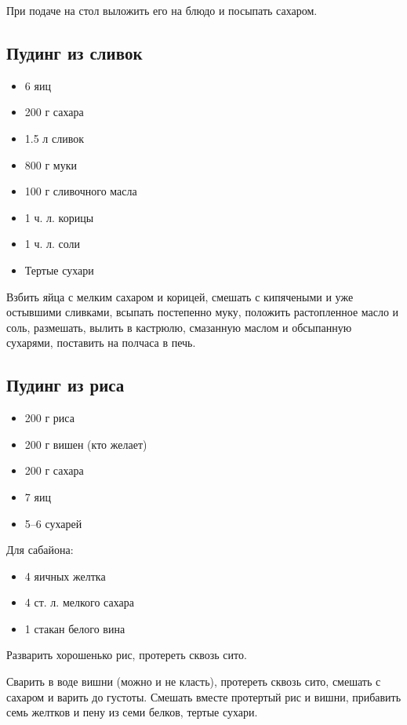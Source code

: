 При подаче на стол выложить его на блюдо и посыпать сахаром.

\subsection{Пудинг из сливок}

\begin{itemize}
	\item 6 яиц 
    \item 200 г сахара 
    \item 1.5 л сливок
    \item 800 г муки
    \item 100 г сливочного масла
    \item 1 ч. л. корицы
    \item 1 ч. л. соли
    \item Тертые сухари
\end{itemize}

Взбить яйца с мелким сахаром и корицей, смешать с кипячеными и уже остывшими сливками, всыпать постепенно муку, положить растопленное масло и соль, размешать, вылить в кастрюлю, смазанную маслом и обсыпанную сухарями, поставить на полчаса в печь.

\subsection{Пудинг из риса}

\begin{itemize}
	\item 200 г риса 
    \item 200 г вишен (кто желает) 
    \item 200 г сахара 
    \item 7 яиц 
    \item 5–6 сухарей
\end{itemize}

Для сабайона: 

\begin{itemize}
	\item 4 яичных желтка 
    \item 4 ст. л. мелкого сахара 
    \item 1 стакан белого вина
\end{itemize}

Разварить хорошенько рис, протереть сквозь сито.

Сварить в воде вишни (можно и не класть), протереть сквозь сито, смешать с сахаром и варить до густоты. Смешать вместе протертый рис и вишни, прибавить семь желтков и пену из семи белков, тертые сухари.

